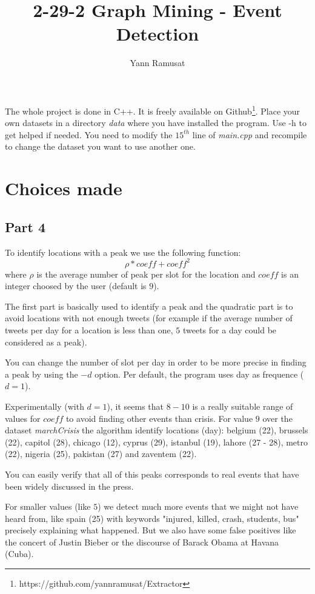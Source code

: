 \documentclass[a4paper]{article}
\title{2-29-2 Graph Mining - Event Detection}
\author{Yann Ramusat}
\begin{document}
\maketitle
The whole project is done in C++. It is freely available on Github\footnote{https://github.com/yannramusat/Extractor}. Place your own datasets in a directory \textit{data} where you have installed the program. Use -h to get helped if needed. 
You need to modify the $15^{th}$ line of \textit{main.cpp} and recompile to change the dataset you want to use another one.

\tableofcontents

\section{Choices made}
\subsection{Part 4}

 To identify locations with a peak we use the following function:
\[
   \rho*coeff + coeff^2
\]
 where $\rho$ is the average number of peak per slot for the location and $coeff$ is an integer choosed by the user (default is $9$). 
 
 The first part is basically used to identify a peak and the quadratic part is to avoid locations with not enough tweets (for example if the average number of tweets per day for a location is less than one, $5$ tweets for a day could be considered as a peak).
 
 You can change the number of slot per day in order to be more precise in finding a peak by using the $-d$ option. Per default, the program uses day as frequence ($d=1$). 
 
 Experimentally (with $d=1$), it seems that $8-10$ is a really suitable range of values for $coeff$ to avoid finding other events than crisis. For value $9$ over the dataset \textit{marchCrisis} the algorithm identify locations (day): belgium (22), brussels (22), capitol (28), chicago (12), cyprus (29), istanbul (19), lahore (27 - 28), metro (22), nigeria (25), pakistan (27) and zaventem (22).
 
 You can easily verify that all of this peaks corresponds to real events that have been widely discussed in the press.
 
 For smaller values (like $5$) we detect much more events that we might not have heard from, like spain (25) with keywords "injured, killed, crash, students, bus" precisely explaining what happened. But we also have some false positives like the concert of Justin Bieber or the discourse of Barack Obama at Havana (Cuba).
 
\end{document}
